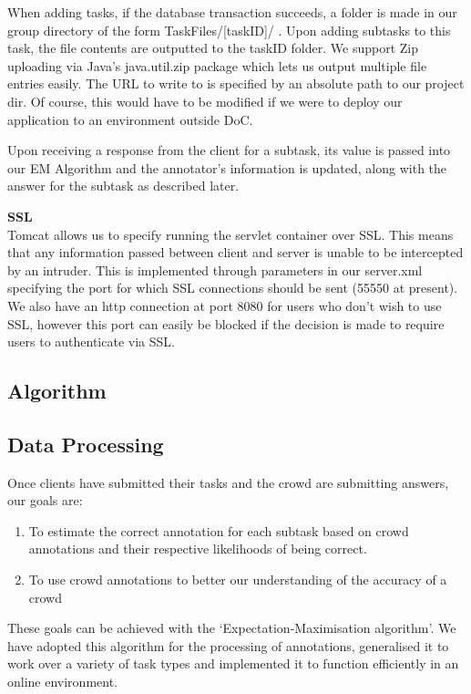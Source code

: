 \documentclass[11pt]{article}
\begin{document}
When adding tasks, if the database transaction succeeds, a folder is made in our group
directory of the form TaskFiles/[taskID]/ . Upon adding subtasks to this task, the
file contents are outputted to the taskID folder. We support Zip uploading via
Java's java.util.zip package which lets us output multiple file entries easily.
The URL to write to is specified by an absolute path to our project dir. Of course, this would
have to be modified if we were to deploy our application to an environment outside DoC.

Upon receiving a response from the client for a subtask, its value is passed into our
EM Algorithm and the annotator's information is updated, along with the answer for the
subtask as described later.

{\bf SSL}
\\
Tomcat allows us to specify running the servlet container over SSL. This means
that any information passed between client and server is unable to be intercepted
by an intruder. This is implemented through parameters in our server.xml specifying
the port for which SSL connections should be sent (55550 at present). We also have
an http connection at port 8080 for users who don't wish to use SSL, however this port can
easily be blocked if the decision is made to require users to authenticate via SSL.

\subsection{Algorithm}

\subsection{Data Processing}

Once clients have submitted their tasks and the crowd are submitting answers, our goals are:
\begin{enumerate}
\item To estimate the correct annotation for each subtask based on crowd annotations and their respective likelihoods of being correct.
\item To use crowd annotations to better our understanding of the accuracy of a crowd
\end{enumerate}

These goals can be achieved with the `Expectation-Maximisation algorithm'. We have adopted this algorithm for the processing of annotations, generalised it to work over a variety of task types and implemented it to function efficiently in an online environment.\\
\end{document}
